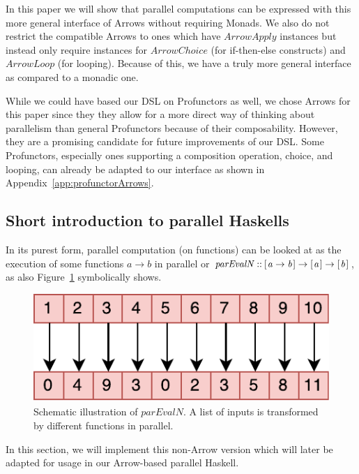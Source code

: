 \documentclass{jfp1}
\newcommand{\Conid}[1]{\mathit{#1}}
\newcommand{\Varid}[1]{\mathit{#1}}
\newcommand{\comm}[2]{}
\newcommand{\mbcomment}[1]{\comm{MB}{#1}}
\begin{document}
In this paper we will show that parallel computations can be expressed with this more general interface of Arrows without requiring Monads. We also do not restrict the compatible Arrows to ones which have \ensuremath{\Conid{ArrowApply}} instances but instead only require instances for \ensuremath{\Conid{ArrowChoice}} (for if-then-else constructs) and \ensuremath{\Conid{ArrowLoop}} (for looping). Because of this, we have a truly more general interface as compared to a monadic one.

While we could have based our DSL on Profunctors as well, we chose Arrows\mbcomment{cite missing?} for this paper since they they allow for a more direct way of thinking about parallelism than general Profunctors because of their composability. However, they are a promising candidate for future improvements of our DSL. Some Profunctors, especially ones supporting a composition operation, choice, and looping, can already be adapted to our interface as shown in Appendix~\ref{app:profunctorArrows}.
	\subsection{Short introduction to parallel Haskells}
\label{sec:parallelHaskells}
\label{sec:parEvalNIntro}
In its purest form, parallel computation (on functions) can be looked at as the execution of some functions \ensuremath{\Varid{a}\to \Varid{b}} in parallel or \ensuremath{\Varid{parEvalN}\mathbin{::}[\mskip1.5mu \Varid{a}\to \Varid{b}\mskip1.5mu]\to [\mskip1.5mu \Varid{a}\mskip1.5mu]\to [\mskip1.5mu \Varid{b}\mskip1.5mu]}, as also Figure~\ref{fig:parEvalN} symbolically shows.
\begin{figure}[t]
  \centering
	\includegraphics[scale=0.7]{images/parEvalN}
	\caption{Schematic illustration of \ensuremath{\Varid{parEvalN}}. A list of inputs is transformed by different functions in parallel.}
	\label{fig:parEvalN}
\end{figure}

In this section, we will implement this non-Arrow version which will later be adapted for usage in our Arrow-based parallel Haskell.
\end{document}
